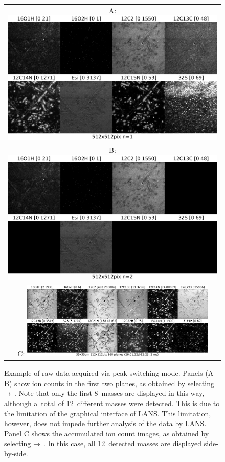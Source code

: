 \begin{figure}[!ht]
\centering
\begin{tabular}{c}
A: \includegraphics[scale=0.43, valign=t]{figs8/m-001}
\\
B: \includegraphics[scale=0.43, valign=t]{figs8/m-002}
\\
C: \includegraphics[width=0.86\textwidth, valign=t]{figs8/2022-01-25-OPG-all}
\end{tabular}
\caption{\label{fig:LANS-8plus-frames}%
Example of raw data acquired via peak-switching mode. Panels (A--B) show ion counts in the first two planes, as obtained by selecting  $\rightarrow$ . Note that only the first 8~masses are displayed in this way, although a~total of 12~different masses were detected. This is due to the limitation of the  graphical interface of LANS. This limitation, however, does not impede further analysis of the data by LANS. Panel C shows the accumulated ion count images, as obtained by selecting   $\rightarrow$ . In this case, all 12~detected masses are displayed side-by-side.}
\end{figure}


